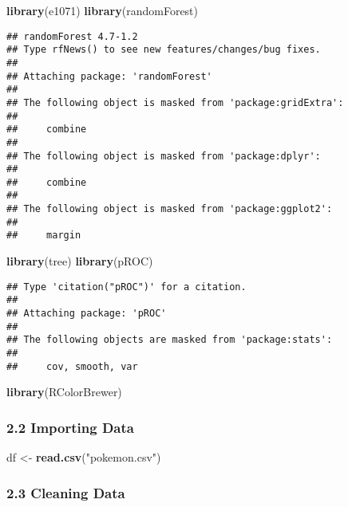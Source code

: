 \documentclass[
]{article}
\newenvironment{Shaded}{\begin{snugshade}}{\end{snugshade}}
\newcommand{\FunctionTok}[1]{\textcolor[rgb]{0.13,0.29,0.53}{\textbf{#1}}}
\newcommand{\NormalTok}[1]{#1}
\newcommand{\OtherTok}[1]{\textcolor[rgb]{0.56,0.35,0.01}{#1}}
\newcommand{\StringTok}[1]{\textcolor[rgb]{0.31,0.60,0.02}{#1}}
\begin{document}
\begin{Shaded}
\begin{Highlighting}[]
\FunctionTok{library}\NormalTok{(e1071)}
\FunctionTok{library}\NormalTok{(randomForest)}
\end{Highlighting}
\end{Shaded}

\begin{verbatim}
## randomForest 4.7-1.2
## Type rfNews() to see new features/changes/bug fixes.
## 
## Attaching package: 'randomForest'
## 
## The following object is masked from 'package:gridExtra':
## 
##     combine
## 
## The following object is masked from 'package:dplyr':
## 
##     combine
## 
## The following object is masked from 'package:ggplot2':
## 
##     margin
\end{verbatim}

\begin{Shaded}
\begin{Highlighting}[]
\FunctionTok{library}\NormalTok{(tree)}
\FunctionTok{library}\NormalTok{(pROC)}
\end{Highlighting}
\end{Shaded}

\begin{verbatim}
## Type 'citation("pROC")' for a citation.
## 
## Attaching package: 'pROC'
## 
## The following objects are masked from 'package:stats':
## 
##     cov, smooth, var
\end{verbatim}

\begin{Shaded}
\begin{Highlighting}[]
\FunctionTok{library}\NormalTok{(RColorBrewer)}
\end{Highlighting}
\end{Shaded}

\subsubsection{2.2 Importing Data}\label{importing-data}

\begin{Shaded}
\begin{Highlighting}[]
\NormalTok{df }\OtherTok{\textless{}{-}} \FunctionTok{read.csv}\NormalTok{(}\StringTok{"pokemon.csv"}\NormalTok{)}
\end{Highlighting}
\end{Shaded}

\subsubsection{2.3 Cleaning Data}\label{cleaning-data}
\end{document}
